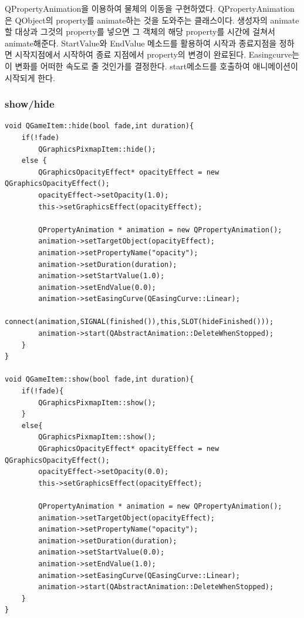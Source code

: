 \documentclass[10pt,oneside,a4paper,titlepage]{article}
\begin{document}
QPropertyAnimation을 이용하여 물체의 이동을 구현하였다. QPropertyAnimation은 QObject의 property를 animate하는 것을 도와주는 클래스이다. 생성자의 animate할 대상과 그것의 property를 넣으면 그 객체의 해당 property를 시간에 걸쳐서 animate해준다. StartValue와 EndValue 메소드를 활용하여 시작과 종료지점을 정하면 시작지점에서 시작하여 종료 지점에서 property의 변경이 완료된다. Easingcurve는 이 변화를 어떠한 속도로 줄 것인가를 결정한다. start메소드를 호출하여 애니메이션이 시작되게 한다.

\subsubsection{show/hide}

\begin{lstlisting}[frame=single,caption=
{QGameItem show/hide},label=code:FD,captionpos=b,framexleftmargin=10pt]
void QGameItem::hide(bool fade,int duration){
    if(!fade)
        QGraphicsPixmapItem::hide();
    else {
        QGraphicsOpacityEffect* opacityEffect = new QGraphicsOpacityEffect();
        opacityEffect->setOpacity(1.0);
        this->setGraphicsEffect(opacityEffect);

        QPropertyAnimation * animation = new QPropertyAnimation();
        animation->setTargetObject(opacityEffect);
        animation->setPropertyName("opacity");
        animation->setDuration(duration);
        animation->setStartValue(1.0);
        animation->setEndValue(0.0);
        animation->setEasingCurve(QEasingCurve::Linear);
        connect(animation,SIGNAL(finished()),this,SLOT(hideFinished()));
        animation->start(QAbstractAnimation::DeleteWhenStopped);
    }
}

void QGameItem::show(bool fade,int duration){
    if(!fade){
        QGraphicsPixmapItem::show();
    }
    else{
        QGraphicsPixmapItem::show();
        QGraphicsOpacityEffect* opacityEffect = new QGraphicsOpacityEffect();
        opacityEffect->setOpacity(0.0);
        this->setGraphicsEffect(opacityEffect);

        QPropertyAnimation * animation = new QPropertyAnimation();
        animation->setTargetObject(opacityEffect);
        animation->setPropertyName("opacity");
        animation->setDuration(duration);
        animation->setStartValue(0.0);
        animation->setEndValue(1.0);
        animation->setEasingCurve(QEasingCurve::Linear);
        animation->start(QAbstractAnimation::DeleteWhenStopped);
    }
}
\end{lstlisting}
\end{document}
